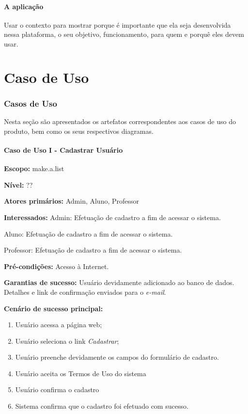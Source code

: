 \documentclass[12pt,oneside,a4paper,article]{abntex2}
\begin{document}
		\subsection{A aplicação}
			Usar o contexto para mostrar porque é importante que ela seja desenvolvida nessa plataforma, o seu objetivo, funcionamento, para quem e porquê eles devem usar.
\part{Caso de Uso}
	\section{Casos de Uso}
		Nesta seção são apresentados os artefatos correspondentes aos casos de uso do produto, bem como os seus respectivos diagramas.
		
		\subsection{Caso de Uso I - Cadastrar Usuário}
		
		\textbf{Escopo:} make.a.list 
		
		\textbf{Nível:} ??
		
		\textbf{Atores primários:} Admin, Aluno, Professor
		
		\textbf{Interessados:} Admin: Efetuação de cadastro a fim de acessar o sistema. 
		
		Aluno: Efetuação de cadastro a fim de acessar o sistema.
		
		Professor: Efetuação de cadastro a fim de acessar o sistema.
		
		\textbf{Pré-condições:} Acesso à Internet.
		
		\textbf{Garantias de sucesso:} Usuário devidamente adicionado ao banco de dados. Detalhes e link de confirmação enviados para o \textit{e-mail}.  
		
		\textbf{Cenário de sucesso principal:}
		
		\begin{enumerate}
			\item Usuário acessa a página web;
			
			\item Usuário seleciona o link \textit{Cadastrar};
			
			\item Usuário preenche devidamente os campos do formulário de cadastro.
			
			\item Usuário aceita os Termos de Uso do sistema
			
			\item Usuário confirma o cadastro
			
			\item Sistema confirma que o cadastro foi efetuado com sucesso.
		\end{enumerate}
		
\end{document}
